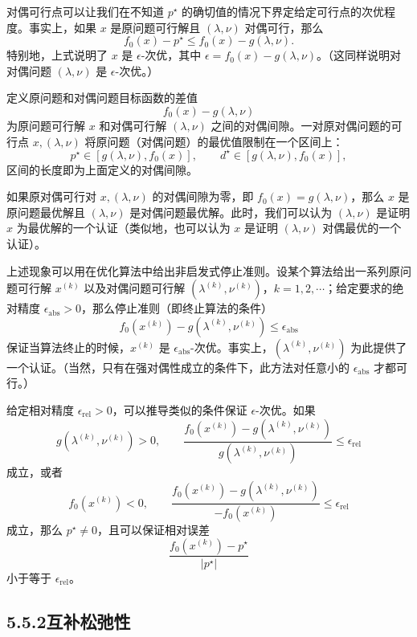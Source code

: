\documentclass[UTF8, 12pt, fontset=fandol, oneside]{ctexart}
\begin{document}
对偶可行点可以让我们在不知道 $p^\star$ 的确切值的情况下界定给定可行点的次优程度。事实上，如果 $x$ 是原问题可行解且 $(\lambda,\nu)$ 对偶可行，那么
\[
f_0(x)-p^\star\leq f_0(x)-g(\lambda,\nu).
\]
特别地，上式说明了 $x$ 是 $\epsilon$-次优，其中 $\epsilon=f_0(x)-g(\lambda,\nu)$。（这同样说明对对偶问题 $(\lambda,\nu)$ 是 $\epsilon$-次优。）

定义原问题和对偶问题目标函数的差值
\[
f_0(x)-g(\lambda,\nu)
\]
为原问题可行解 $x$ 和对偶可行解 $(\lambda,\nu)$ 之间的对偶间隙。一对原对偶问题的可行点 $x,(\lambda,\nu)$ 将原问题（对偶问题）的最优值限制在一个区间上：
\[
p^\star\in[g(\lambda,\nu),f_0(x)],\qquad
d^\star\in[g(\lambda,\nu),f_0(x)],
\]
区间的长度即为上面定义的对偶间隙。

如果原对偶可行对 $x,(\lambda,\nu)$ 的对偶间隙为零，即 $f_0(x)=g(\lambda,\nu)$，那么 $x$ 是原问题最优解且 $(\lambda,\nu)$ 是对偶问题最优解。此时，我们可以认为 $(\lambda,\nu)$ 是证明 $x$ 为最优解的一个认证（类似地，也可以认为 $x$ 是证明 $(\lambda,\nu)$ 对偶最优的一个认证）。

上述现象可以用在优化算法中给出非启发式停止准则。设某个算法给出一系列原问题可行解 $x^{(k)}$ 以及对偶问题可行解 $(\lambda^{(k)},\nu^{(k)})$，$k=1,2,\cdots$；给定要求的绝对精度 $\epsilon_{\mathrm{abs}}>0$，那么停止准则（即终止算法的条件）
\[
f_0(x^{(k)})-g(\lambda^{(k)},\nu^{(k)})\leq \epsilon_{\mathrm{abs}}
\]
保证当算法终止的时候，$x^{(k)}$ 是 $\epsilon_{\mathrm{abs}}$-次优。事实上，$(\lambda^{(k)},\nu^{(k)})$ 为此提供了一个认证。（当然，只有在强对偶性成立的条件下，此方法对任意小的 $\epsilon_{\mathrm{abs}}$ 才都可行。）

给定相对精度 $\epsilon_{\mathrm{rel}}>0$，可以推导类似的条件保证 $\epsilon$-次优。如果
\[
g(\lambda^{(k)},\nu^{(k)})>0,\qquad
\frac{f_0(x^{(k)})-g(\lambda^{(k)},\nu^{(k)})}{g(\lambda^{(k)},\nu^{(k)})}\leq \epsilon_{\mathrm{rel}}
\]
成立，或者
\[
f_0(x^{(k)})<0,\qquad
\frac{f_0(x^{(k)})-g(\lambda^{(k)},\nu^{(k)})}{-f_0(x^{(k)})}\leq \epsilon_{\mathrm{rel}}
\]
成立，那么 $p^\star\neq 0$，且可以保证相对误差
\[
\frac{f_0(x^{(k)})-p^\star}{|p^\star|}
\]
小于等于 $\epsilon_{\mathrm{rel}}$。

\subsection*{5.5.2\quad 互补松弛性}
\end{document}
